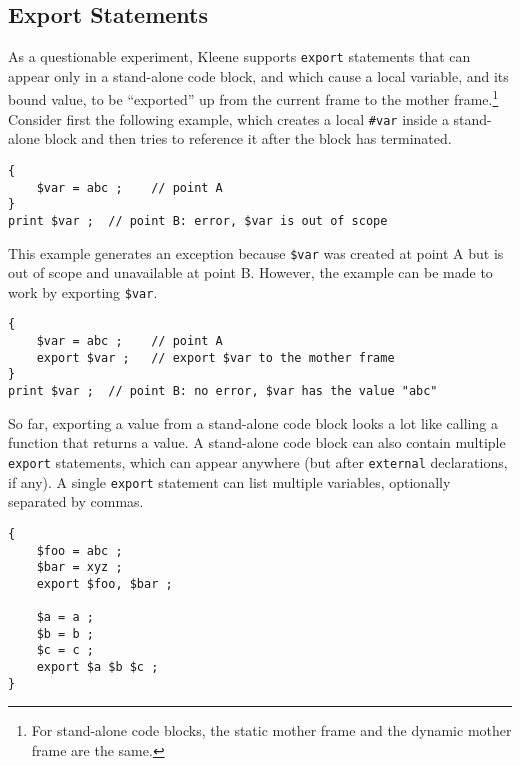 \subsection{Export Statements}

As a questionable experiment, Kleene supports \texttt{export} statements that can
appear only in a stand-alone code block, and which cause a local
variable, and its bound value, to be ``exported'' up from the current
frame to the mother frame.\footnote{For stand-alone code blocks, the
static mother frame and the dynamic mother frame are the same.} Consider
first the following example, which creates a local \verb!#var! inside a
stand-alone block and then tries to reference it after the block has
terminated.

\begin{samepage}
\begin{Verbatim}
{
    $var = abc ;	// point A
}
print $var ;  // point B: error, $var is out of scope
\end{Verbatim}
\end{samepage}

\noindent
This example generates an exception because \verb!$var! was created at point
A but is out of scope and unavailable at point B.  However, the example can be made to work by exporting \verb!$var!.

\begin{samepage}
\begin{Verbatim}
{
    $var = abc ;	// point A
    export $var ;	// export $var to the mother frame
}
print $var ;  // point B: no error, $var has the value "abc"
\end{Verbatim}
\end{samepage}

So far, exporting a value from a stand-alone code block looks a lot like
calling a function that returns a value.  A stand-alone code block can also
contain multiple \texttt{export} statements,
which can appear anywhere (but after \texttt{external} declarations, if
any).  A single \texttt{export} statement can list multiple variables,
optionally separated by commas.

\begin{samepage}
\begin{Verbatim}
{
    $foo = abc ;
    $bar = xyz ;
    export $foo, $bar ;

    $a = a ;
    $b = b ;
    $c = c ;
    export $a $b $c ;
}
\end{Verbatim}
\end{samepage}


